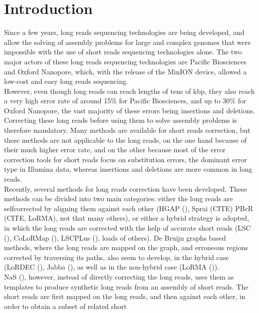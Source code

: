\documentclass{bioinfo}
\begin{document}
\section{Introduction}
\label{sec:introduction}

Since a few years, long reads sequencing technologies are being developed, and allow the solving of assembly problems for large and complex
genomes that were impossible with the use of short reads sequencing technologies alone. The two major actors of these long reads sequencing technologies are
Pacific Biosciences and Oxford Nanopore, which, with the release of the MinION device, allowed a low-cost and easy long reads sequencing. \\
\indent However, even though long reads can reach lengths of tens of kbp, they also reach a very high error rate of around 15\% for Pacific Biosciences, and up to 30\% for Oxford Nanopore, the vast majority of these errors being insertions and deletions. Correcting these long reads before using them to solve assembly problems is therefore mandatory. Many methods are available for short reads correction, but these methods are not applicable to the long reads, on the one hand because of their much higher error rate, and on the other because most of the error correction tools for short reads focus on substitution errors, the dominant error type in Illumina data, whereas insertions and deletions are more common in long reads. \\
\indent Recently, several methods for long reads correction have been developed. These methods can be divided into two main categories: either
the long reads are selfcorrected by aligning them against each other (HGAP (\cite{Chin2013}), Sprai (CITE) PBcR (CITE, LoRMA), not that many others), or either a hybrid strategy is adopted, in which the long reads are corrected with the help of accurate short reads (LSC (\cite{Au2012}), CoLoRMap (\cite{Haghshenas2016}), LSCPLus (\cite{Hu2016}), loads of others). De Bruijn graphs based methods, where the long reads are mapped on the graph, and erroneous regions corrected by traversing its paths, also seem to develop, in the hybrid case (LoRDEC (\cite{Salmela2014}), Jabba (\cite{Miclotte2016}), as well as in the non-hybrid case (LoRMA (\cite{Salmela2016})). \\
\indent NaS (\cite{Madoui2015}), however, instead of directly correcting the long reads, uses them as templates to produce synthetic long reads from an assembly of short reads. The short reads are first mapped on the long reads, and then against each other, in order to obtain a subset of related short
\end{document}
